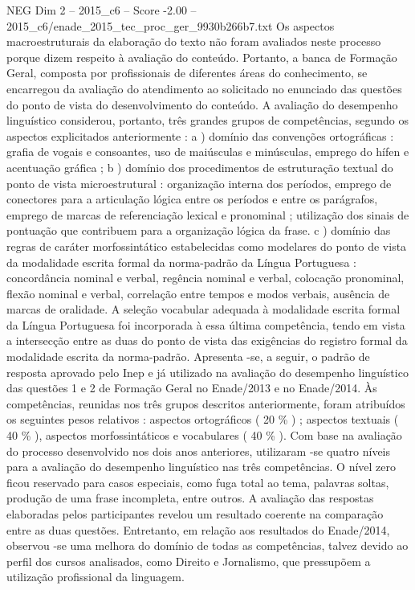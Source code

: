 \begin{textsample}{NEG Dim 2 – 2015\_c6 – Score -2.00 – 2015\_c6/enade\_2015\_tec\_proc\_ger\_9930b266b7.txt}
Os aspectos macroestruturais da elaboração do texto não foram avaliados neste processo porque dizem respeito à avaliação do conteúdo.
Portanto, a banca de Formação Geral, composta por profissionais de diferentes áreas do conhecimento, se encarregou da avaliação do atendimento ao solicitado no enunciado das questões do ponto de vista do desenvolvimento do conteúdo.
A avaliação do desempenho linguístico considerou, portanto, três grandes grupos de competências, segundo os aspectos explicitados anteriormente : a ) domínio das convenções ortográficas : grafia de vogais e consoantes, uso de maiúsculas e minúsculas, emprego do hífen e acentuação gráfica ; b ) domínio dos procedimentos de estruturação textual do ponto de vista microestrutural : organização interna dos períodos, emprego de conectores para a articulação lógica entre os períodos e entre os parágrafos, emprego de marcas de referenciação lexical e pronominal ; utilização dos sinais de pontuação que contribuem para a organização lógica da frase. c ) domínio das regras de caráter morfossintático estabelecidas como modelares do ponto de vista da modalidade escrita formal da norma-padrão da Língua Portuguesa : concordância nominal e verbal, regência nominal e verbal, colocação pronominal, flexão nominal e verbal, correlação entre tempos e modos verbais, ausência de marcas de oralidade.
A seleção vocabular adequada à modalidade escrita formal da Língua Portuguesa foi incorporada à essa última competência, tendo em vista a intersecção entre as duas do ponto de vista das exigências do registro formal da modalidade escrita da norma-padrão.
Apresenta -se, a seguir, o padrão de resposta aprovado pelo Inep e já utilizado na avaliação do desempenho linguístico das questões 1 e 2 de Formação Geral no Enade/2013 e no Enade/2014.
Às competências, reunidas nos três grupos descritos anteriormente, foram atribuídos os seguintes pesos relativos : aspectos ortográficos ( 20 \% ) ; aspectos textuais ( 40 \% ), aspectos morfossintáticos e vocabulares ( 40 \% ).
Com base na avaliação do processo desenvolvido nos dois anos anteriores, utilizaram -se quatro níveis para a avaliação do desempenho linguístico nas três competências.
O nível zero ficou reservado para casos especiais, como fuga total ao tema, palavras soltas, produção de uma frase incompleta, entre outros.
A avaliação das respostas elaboradas pelos participantes revelou um resultado coerente na comparação entre as duas questões.
Entretanto, em relação aos resultados do Enade/2014, observou -se uma melhora do domínio de todas as competências, talvez devido ao perfil dos cursos analisados, como Direito e Jornalismo, que pressupõem a utilização profissional da linguagem.

\end{textsample}
